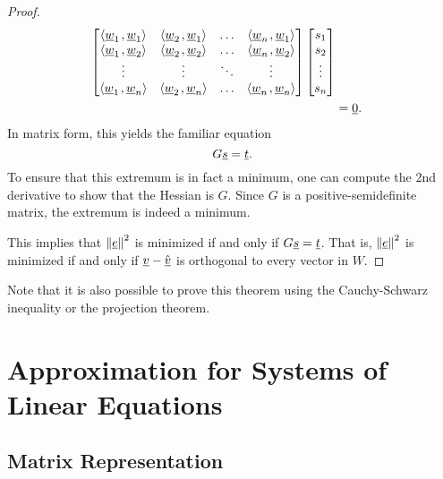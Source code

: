 \begin{proof}
\begin{equation*}
\begin{split}
\begin{bmatrix}
{\left\langle  \underline{w}_1  \mskip2mu ,  \underline{w}_1  \right\rangle} &
{\left\langle  \underline{w}_2  \mskip2mu ,  \underline{w}_1  \right\rangle} & \hdots &
{\left\langle  \underline{w}_n  \mskip2mu ,  \underline{w}_1  \right\rangle} \\
{\left\langle  \underline{w}_1  \mskip2mu ,  \underline{w}_2  \right\rangle} &
{\left\langle  \underline{w}_2  \mskip2mu ,  \underline{w}_2  \right\rangle} & \hdots &
{\left\langle  \underline{w}_n  \mskip2mu ,  \underline{w}_2  \right\rangle} \\
\vdots & \vdots & \ddots & \vdots \\
{\left\langle  \underline{w}_1  \mskip2mu ,  \underline{w}_n  \right\rangle} &
{\left\langle  \underline{w}_2  \mskip2mu ,  \underline{w}_n  \right\rangle} & \hdots &
{\left\langle  \underline{w}_n  \mskip2mu ,  \underline{w}_n  \right\rangle} \\
\end{bmatrix}
\begin{bmatrix} s_1 \\ s_2 \\ \vdots \\ s_n \end{bmatrix} \\
&= \underline{0} .
\end{split}
\end{equation*}
In matrix form, this yields the familiar equation
\begin{equation*}
G \underline{s} = \underline{t}.
\end{equation*}
To ensure that this extremum is in fact a minimum, one can compute the 2nd derivative to show that the Hessian is $G$.
Since $G$ is a positive-semidefinite matrix, the extremum is indeed a minimum.

This implies that $\left\| \underline{e} \right\|^2$ is minimized if and only if $G \underline{s} = \underline{t}$.
That is, $\left\| \underline{e} \right\|^2$ is minimized if and only if $\underline{v} - \hat{\underline{v}}$ is orthogonal to every vector in $W$.
\end{proof}

Note that it is also possible to prove this theorem using the Cauchy-Schwarz inequality or the projection theorem.


\section{Approximation for Systems of Linear Equations}

\subsection{Matrix Representation}

